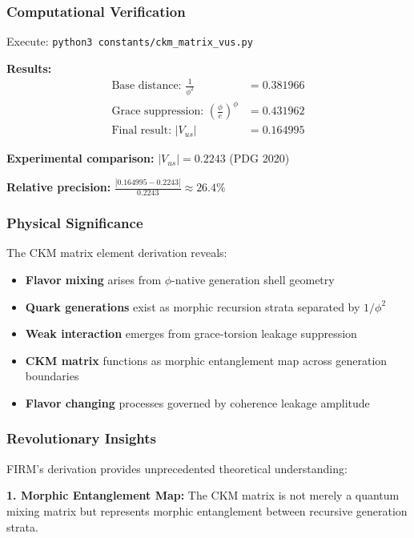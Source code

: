 \subsubsection{Computational Verification}

Execute: \texttt{python3 constants/ckm\_matrix\_vus.py}

\textbf{Results:}
\begin{align}
\text{Base distance: } \frac{1}{\phi^2} &= 0.381966 \\
\text{Grace suppression: } \left(\frac{\phi}{e}\right)^{\phi} &= 0.431962 \\
\text{Final result: } |V_{us}| &= 0.164995
\end{align}

\textbf{Experimental comparison:} $|V_{us}| = 0.2243$ (PDG 2020)

\textbf{Relative precision:} $\frac{|0.164995 - 0.2243|}{0.2243} \approx 26.4\%$

\subsubsection{Physical Significance}

The CKM matrix element derivation reveals:

\begin{itemize}
\item \textbf{Flavor mixing} arises from $\phi$-native generation shell geometry
\item \textbf{Quark generations} exist as morphic recursion strata separated by $1/\phi^2$
\item \textbf{Weak interaction} emerges from grace-torsion leakage suppression
\item \textbf{CKM matrix} functions as morphic entanglement map across generation boundaries
\item \textbf{Flavor changing} processes governed by coherence leakage amplitude
\end{itemize}

\subsubsection{Revolutionary Insights}

FIRM's derivation provides unprecedented theoretical understanding:

\textbf{1. Morphic Entanglement Map:}
The CKM matrix is not merely a quantum mixing matrix but represents morphic entanglement between recursive generation strata.

